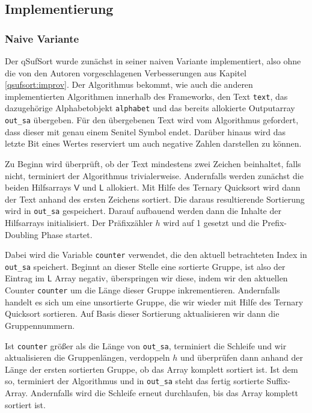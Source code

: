 \subsection{Implementierung}
\label{qsufsort:impl}
\subsubsection{Naive Variante}
Der qSufSort wurde zunächst in seiner naiven Variante implementiert, also ohne die von den Autoren vorgeschlagenen Verbesserungen aus Kapitel \ref{qsufsort:improv}. Der Algorithmus bekommt, wie auch die anderen implementierten Algorithmen innerhalb des Frameworks, den Text \texttt{text}, das dazugehörige Alphabetobjekt \texttt{alphabet} und das bereits allokierte Outputarray \texttt{out_sa} übergeben. Für den übergebenen Text wird vom Algorithmus gefordert, dass dieser mit genau einem Senitel Symbol endet. Darüber hinaus wird das letzte Bit eines Wertes reserviert um auch negative Zahlen darstellen zu können.

Zu Beginn wird überprüft, ob der Text mindestens zwei Zeichen beinhaltet, falls nicht, terminiert der Algorithmus trivialerweise. Andernfalls werden zunächst die beiden Hilfsarrays $\mathsf{V}$ und $\mathsf{L}$ allokiert. Mit Hilfe des Ternary Quicksort wird dann der Text anhand des ersten Zeichens sortiert. Die daraus resultierende Sortierung wird in \texttt{out_sa} gespeichert. Darauf aufbauend werden dann die Inhalte der Hilfsarrays initialisiert. Der Präfixzähler $h$ wird auf 1 gesetzt und die Prefix-Doubling Phase startet. 

Dabei wird die Variable \texttt{counter} verwendet, die den aktuell betrachteten Index in \texttt{out_sa} speichert. Beginnt an dieser Stelle eine sortierte Gruppe, ist also der Eintrag im $\mathsf{L}$ Array negativ, überspringen wir diese, indem wir den aktuellen Counter \texttt{counter} um die Länge dieser Gruppe inkrementieren. Andernfalls handelt es sich um eine unsortierte Gruppe, die wir wieder mit Hilfe des Ternary Quicksort sortieren. Auf Basis dieser Sortierung aktualisieren wir dann die Gruppennummern.

Ist \texttt{counter} größer als die Länge von \texttt{out_sa}, terminiert die Schleife und wir aktualisieren die Gruppenlängen, verdoppeln $h$ und überprüfen dann anhand der Länge der ersten sortierten Gruppe, ob das Array komplett sortiert ist. Ist dem so, terminiert der Algorithmus und in \texttt{out_sa} steht das fertig sortierte Suffix-Array. Andernfalls wird die Schleife erneut durchlaufen, bis das Array komplett sortiert ist.

